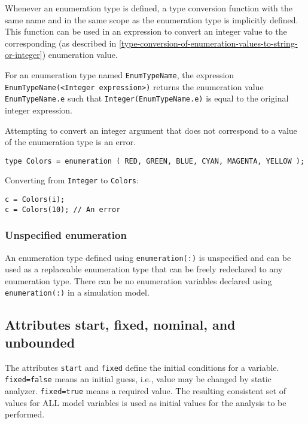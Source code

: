 Whenever an enumeration type is defined, a type conversion function with
the same name and in the same scope as the enumeration type is
implicitly defined. This function can be used in an expression to
convert an integer value to the corresponding (as described in \cref{type-conversion-of-enumeration-values-to-string-or-integer}) enumeration value.

For an enumeration type named \lstinline!EnumTypeName!, the expression
\lstinline!EnumTypeName(<Integer expression>)! returns the
enumeration value \lstinline!EnumTypeName.e! such that \lstinline!Integer(EnumTypeName.e)! is
equal to the original integer expression.

Attempting to convert an integer argument that does not correspond to a
value of the enumeration type is an error.

\begin{example}
\begin{lstlisting}[language=modelica]
type Colors = enumeration ( RED, GREEN, BLUE, CYAN, MAGENTA, YELLOW );
\end{lstlisting}

Converting from \lstinline!Integer! to \lstinline!Colors!:
\begin{lstlisting}[language=modelica]
c = Colors(i);
c = Colors(10); // An error
\end{lstlisting}
\end{example}

\subsubsection{Unspecified enumeration}\label{unspecified-enumeration}

An enumeration type defined using \lstinline!enumeration(:)! is unspecified and can
be used as a replaceable enumeration type that can be freely redeclared
to any enumeration type. There can be no enumeration variables declared
using \lstinline!enumeration(:)! in a simulation model.



\subsection{Attributes start, fixed, nominal, and unbounded}\label{attributes-start-fixed-nominal-and-unbounded}

The attributes \lstinline!start! and \lstinline!fixed! define the initial conditions for a
variable. \lstinline!fixed=false! means an initial guess, i.e., value may be
changed by static analyzer. \lstinline!fixed=true! means a required value. The
resulting consistent set of values for ALL model variables is used as
initial values for the analysis to be performed.

